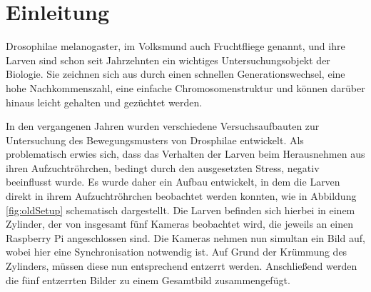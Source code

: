 \chapter{Einleitung}
Drosophilae melanogaster, im Volksmund auch Fruchtfliege genannt, und ihre Larven sind schon seit Jahrzehnten ein wichtiges Untersuchungsobjekt der Biologie. Sie zeichnen sich aus durch einen schnellen Generationswechsel, eine hohe Nachkommenszahl, eine einfache Chromosomenstruktur und können darüber hinaus leicht gehalten und gezüchtet werden.

In den vergangenen Jahren wurden verschiedene Versuchsaufbauten zur Untersuchung des Bewegungsmusters von Drosphilae entwickelt.
Als problematisch erwies sich, dass das Verhalten der Larven beim Herausnehmen aus ihren Aufzuchtröhrchen, bedingt durch den ausgesetzten Stress, negativ beeinflusst wurde.
Es wurde daher ein Aufbau entwickelt, in dem die Larven direkt in ihrem Aufzuchtröhrchen beobachtet werden konnten, wie in Abbildung \ref{fig:oldSetup} schematisch dargestellt.
Die Larven befinden sich hierbei in einem Zylinder, der von insgesamt fünf Kameras beobachtet wird, die jeweils an einen Raspberry Pi angeschlossen sind. Die Kameras nehmen nun simultan ein Bild auf, wobei hier eine Synchronisation notwendig ist. Auf Grund der Krümmung des Zylinders, müssen diese nun entsprechend entzerrt werden. Anschließend werden die fünf entzerrten Bilder zu einem Gesamtbild zusammengefügt.
